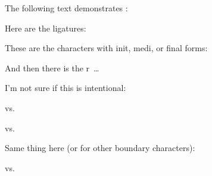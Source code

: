 \documentclass{article}
\DeclareRobustCommand\jena{\fontfamily{jena}\selectfont}
\begin{document}
\noindent
The following text demonstrates :
\bigskip

{\Large\jena \def\TeX{TeX}%
 \noindent }
\bigskip

\noindent
Here are the ligatures:\par
{}

\noindent
These are the characters with init, medi, or final forms:\par
{}

\noindent
And then there is the r~\ldots\par
{}

\noindent
I'm not sure if this is intentional:\par
{} vs. \par
{} vs. \par

\noindent
Same thing here (or for other boundary characters):\par
{} vs. 
\end{document}
